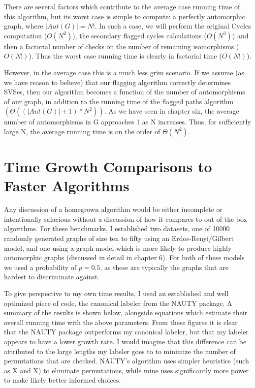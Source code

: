 There are several factors which contribute to the average case running time of this algorithm, but its worst case is simple to compute: a perfectly automorphic graph, where $|Aut(G)| = N!$.
In such a case, we will perform the original Cycles computation ($O(N^2)$), the secondary flagged cycles calculations ($O(N^3)$) and then a factorial number of checks on the number of remaining isomorphisms ($O(N!)$).
Thus the worst case running time is clearly in factorial time ($O(N!)$).

However, in the average case this is a much less grim scenario.
If we assume (as we have reason to believe) that our flagging algorithm correctly determines SVSes, then our algorithm becomes a function of the number of automorphisms of our graph, in addition to the running time of the flagged paths algorithm $(\Theta((|Aut(G)| +1) * N^2))$.
As we have seen in chapter six, the average number of automorphisms in G approaches 1 as N increases. Thus, for sufficiently large N, the average running time is on the order of $\Theta(N^2)$.

\section{Time Growth Comparisons to Faster Algorithms}
Any discussion of a homegrown algorithm would be either incomplete or intentionally salacious without a discussion of how it compares to out of the box algorithms.
For these benchmarks, I established two datasets, one of 10000 randomly generated graphs of size ten to fifty using an Erdos-Renyi/Gilbert model, and one using a graph model which is more likely to produce highly automorphic graphs (discussed in detail in chapter 6).
For both of these models we used a probability of $p=0.5$, as these are typically the graphs that are hardest to discriminate against.

To give perspective to my own time results, I used an established and well optimized piece of code, the canonical labeler from the NAUTY package.
A summary of the results is shown below, alongside equations which estimate their overall running time with the above parameters.
From these figures it is clear that the NAUTY package outperforms my canonical labeler, but that my labeler appears to have a lower growth rate.
I would imagine that this difference can be attributed to the large lengths my labeler goes to to minimize the number of permutations that are checked.
NAUTY's algorithm uses simpler heuristics (such as X and X) to eliminate permutations, while mine uses significantly more power to make likely better informed choices.
